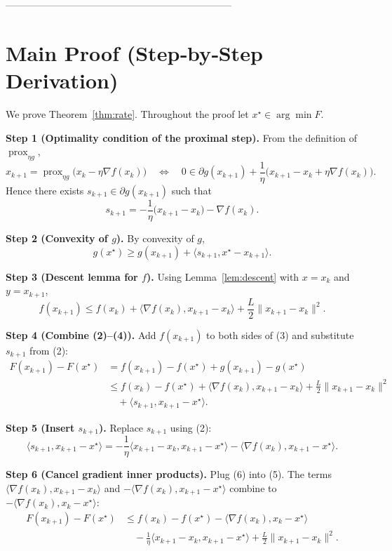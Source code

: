 \documentclass{article}
\newcommand{\prox}{\operatorname{prox}}
\newcommand{\grad}{\nabla}
\begin{document}
---------------------------------------------------------------------

\section*{Main Proof (Step‑by‑Step Derivation)}
We prove Theorem~\ref{thm:rate}. Throughout the proof let $x^{\star}\in\arg\min F$.

\noindent\textbf{Step 1 (Optimality condition of the proximal step).}  
From the definition of $\prox_{\eta g}$,
\[
x_{k+1}= \prox_{\eta g}\!\bigl(x_{k}-\eta\grad f(x_{k})\bigr)
\quad\Longleftrightarrow\quad
0\in \partial g(x_{k+1})+\frac{1}{\eta}\bigl(x_{k+1}-x_{k}+\eta\grad f(x_{k})\bigr).
\tag{1}
\]
Hence there exists $s_{k+1}\in\partial g(x_{k+1})$ such that
\[
s_{k+1}= -\frac{1}{\eta}\bigl(x_{k+1}-x_{k}\bigr)-\grad f(x_{k}).
\tag{2}
\]

\noindent\textbf{Step 2 (Convexity of $g$).}  
By convexity of $g$,
\[
g(x^{\star})\ge g(x_{k+1})+\langle s_{k+1},x^{\star}-x_{k+1}\rangle.
\tag{3}
\]

\noindent\textbf{Step 3 (Descent lemma for $f$).}  
Using Lemma~\ref{lem:descent} with $x=x_{k}$ and $y=x_{k+1}$,
\[
f(x_{k+1})\le f(x_{k})+\langle\grad f(x_{k}),x_{k+1}-x_{k}\rangle+\frac{L}{2}\|x_{k+1}-x_{k}\|^{2}.
\tag{4}
\]

\noindent\textbf{Step 4 (Combine (2)–(4)).}  
Add $f(x_{k+1})$ to both sides of (3) and substitute $s_{k+1}$ from (2):
\[
\begin{aligned}
F(x_{k+1})-F(x^{\star})
&= f(x_{k+1})-f(x^{\star})+g(x_{k+1})-g(x^{\star})\\
&\le f(x_{k})-f(x^{\star})+\langle\grad f(x_{k}),x_{k+1}-x_{k}\rangle
      +\frac{L}{2}\|x_{k+1}-x_{k}\|^{2}\\
&\quad +\langle s_{k+1},x_{k+1}-x^{\star}\rangle .
\end{aligned}
\tag{5}
\]

\noindent\textbf{Step 5 (Insert $s_{k+1}$).}  
Replace $s_{k+1}$ using (2):
\[
\langle s_{k+1},x_{k+1}-x^{\star}\rangle
= -\frac{1}{\eta}\langle x_{k+1}-x_{k},x_{k+1}-x^{\star}\rangle
  -\langle\grad f(x_{k}),x_{k+1}-x^{\star}\rangle .
\tag{6}
\]

\noindent\textbf{Step 6 (Cancel gradient inner products).}  
Plug (6) into (5). The terms $\langle\grad f(x_{k}),x_{k+1}-x_{k}\rangle$ and $-\langle\grad f(x_{k}),x_{k+1}-x^{\star}\rangle$ combine to $-\langle\grad f(x_{k}),x_{k}-x^{\star}\rangle$:
\[
\begin{aligned}
F(x_{k+1})-F(x^{\star})
&\le f(x_{k})-f(x^{\star})-\langle\grad f(x_{k}),x_{k}-x^{\star}\rangle\\
&\quad -\frac{1}{\eta}\langle x_{k+1}-x_{k},x_{k+1}-x^{\star}\rangle
      +\frac{L}{2}\|x_{k+1}-x_{k}\|^{2}.
\end{aligned}
\tag{7}
\]
\end{document}
